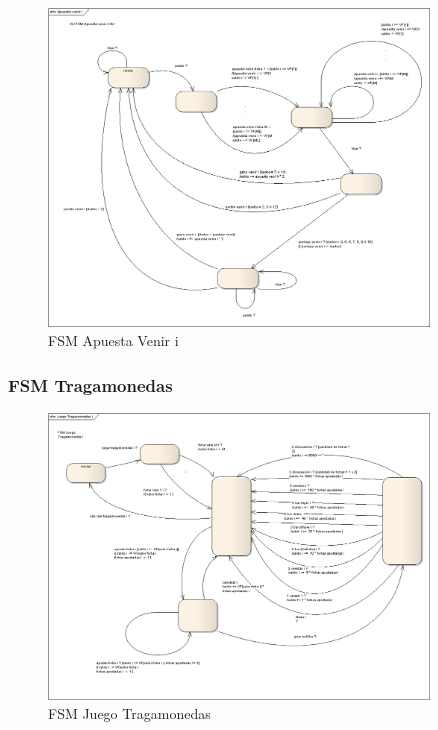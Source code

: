         \begin{figure}[p!hbt]
		\centering
		\includegraphics[angle=90, width=0.9\textwidth]{../img/FSM_ApuestaVenir.png}
		\caption{FSM Apuesta Venir i }
		\label{fig:FSM_ApuestaVenir}
	\end{figure}



\subsubsection{FSM Tragamonedas}



        \begin{figure}[p!hbt]
		\centering
		\includegraphics[angle=90, width=0.9\textwidth]{../img/FSM_JuegoTragamonedas.png}
		\caption{FSM Juego Tragamonedas }
		\label{fig: FSMtraga}
	\end{figure}

